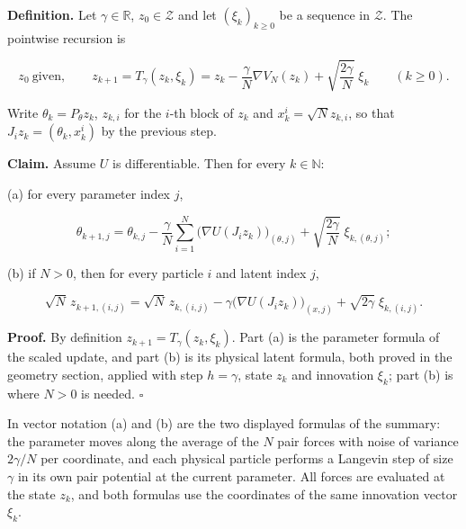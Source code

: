 \documentclass[11pt,a4paper]{article}
\begin{document}
\textbf{Definition.} Let \(\gamma\in\mathbb R\), \(z_0\in\mathcal Z\) and let \((\xi_k)_{k\ge0}\) be a sequence in \(\mathcal Z\). The pointwise recursion is


\[z_0\ \text{given},\qquad z_{k+1}=T_\gamma(z_k,\xi_k)=z_k-\frac\gamma N\nabla V_N(z_k)+\sqrt{\frac{2\gamma}N}\;\xi_k\qquad(k\ge0).\]


Write \(\theta_k=P_\theta z_k\), \(z_{k,i}\) for the \(i\)-th block of \(z_k\) and \(x_k^i=\sqrt Nz_{k,i}\), so that \(J_iz_k=(\theta_k,x_k^i)\) by the previous step.




\textbf{Claim.} Assume \(U\) is differentiable. Then for every \(k\in\mathbb N\):




(a) for every parameter index \(j\),


\[\theta_{k+1,j}=\theta_{k,j}-\frac\gamma N\sum_{i=1}^N\bigl(\nabla U(J_iz_k)\bigr)_{(\theta,j)}+\sqrt{\frac{2\gamma}N}\;\xi_{k,(\theta,j)};\]


(b) if \(N>0\), then for every particle \(i\) and latent index \(j\),


\[\sqrt N\,z_{k+1,(i,j)}=\sqrt N\,z_{k,(i,j)}-\gamma\bigl(\nabla U(J_iz_k)\bigr)_{(x,j)}+\sqrt{2\gamma}\;\xi_{k,(i,j)} .\]


\textbf{Proof.} By definition \(z_{k+1}=T_\gamma(z_k,\xi_k)\). Part (a) is the parameter formula of the scaled update, and part (b) is its physical latent formula, both proved in the geometry section, applied with step \(h=\gamma\), state \(z_k\) and innovation \(\xi_k\); part (b) is where \(N>0\) is needed. \(\square\)




In vector notation (a) and (b) are the two displayed formulas of the summary: the parameter moves along the average of the \(N\) pair forces with noise of variance \(2\gamma/N\) per coordinate, and each physical particle performs a Langevin step of size \(\gamma\) in its own pair potential at the current parameter. All forces are evaluated at the state \(z_k\), and both formulas use the coordinates of the same innovation vector \(\xi_k\).
\end{document}
